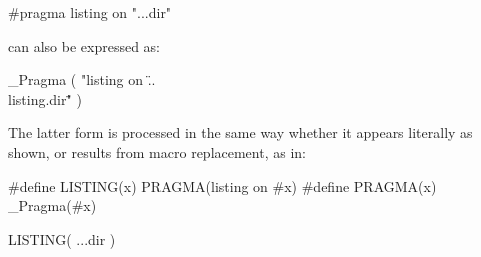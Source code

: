 \pnum
\begin{example}
\begin{codeblock}
#pragma listing on "..\listing.dir"
\end{codeblock}
can also be expressed as:
\begin{codeblock}
_Pragma ( "listing on \"..\\listing.dir\"" )
\end{codeblock}
The latter form is processed in the same way whether it appears literally
as shown, or results from macro replacement, as in:
\begin{codeblock}
#define LISTING(x) PRAGMA(listing on #x)
#define PRAGMA(x) _Pragma(#x)

LISTING( ..\listing.dir )
\end{codeblock}
\end{example}
